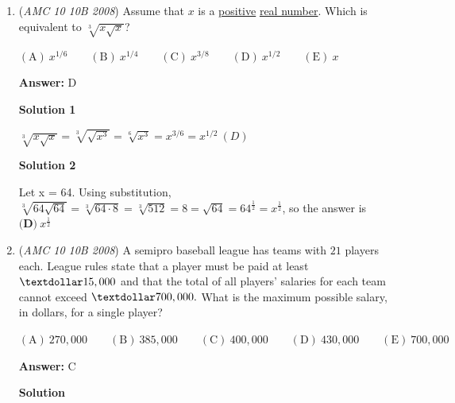 \begin{enumerate}
 The positive difference between the two diagonal sums is then $(4+9+16+25)-(1+10+17+22)=3-1-1+3=\boxed{\textbf{(B) } 4}$.

 



\textbf{Solution 2}

Notice that at baseline the diagonals sum to the same number ($52$).  Therefore we need only compute the effect of the swap.  The positive difference between $9$ and $10$ is $1$ and the positive difference between $22$ and $25$ is $3$. Adding gives $1+3=\boxed{\textbf{(B) } 4}$



	\item (\textit{AMC 10 10B 2008}) Assume that $x$ is a \href{https://artofproblemsolving.com/wiki/index.php?title=Positive}{positive} \href{https://artofproblemsolving.com/wiki/index.php?title=Real\_number}{real number}. Which is equivalent to $\sqrt[3]{x\sqrt{x}}$?


 $\mathrm{(A)}\ x^{1/6}\qquad\mathrm{(B)}\ x^{1/4}\qquad\mathrm{(C)}\ x^{3/8}\qquad\mathrm{(D)}\ x^{1/2}\qquad\mathrm{(E)}\ x$

 \textbf{Answer: }D



\textbf{Solution 1}

$\sqrt[3]{x\sqrt{x}}=\sqrt[3]{\sqrt{x^3}}=\sqrt[6]{x^3}=x^{3/6}=x^{1/2}\ \boxed{(D)}$




\textbf{Solution 2}

Let x = 64. Using substitution, $\sqrt[3]{64\sqrt{64}} = \sqrt[3]{64 \cdot 8} = \sqrt[3]{512} = 8 = \sqrt{64} = 64^\frac{1}{2} = x^\frac{1}{2}$, so the answer is $\boxed{\textbf{(D)}\ x^\frac{1}{2}}$



	\item (\textit{AMC 10 10B 2008}) A semipro baseball league has teams with $21$ players each. League rules state that a player must be paid at least $\textdollar 15,000$ and that the total of all players' salaries for each team cannot exceed $\textdollar 700,000.$ What is the maximum possible salary, in dollars, for a single player?


 $\mathrm{(A)}\ 270,000\qquad\mathrm{(B)}\ 385,000\qquad\mathrm{(C)}\ 400,000\qquad\mathrm{(D)}\ 430,000\qquad\mathrm{(E)}\ 700,000$

 \textbf{Answer: }C



\textbf{Solution}


\end{enumerate}
